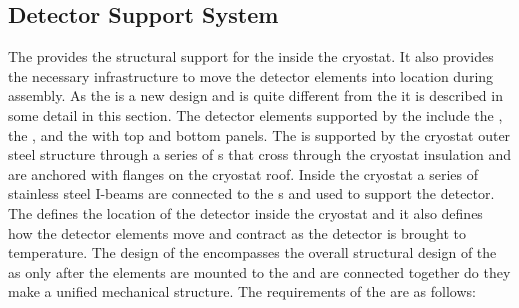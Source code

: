 \subsection{Detector Support System}
\label{sec:fdsp-tc-infr-dss}

The  provides the structural support for the 
inside the cryostat.  It also provides the necessary
infrastructure to move the detector elements into location during
assembly. As the  is a new design and is quite different
from the   it is described in some detail in this
section. The detector elements supported by the  include
the , the , and the  with
top and bottom  panels.  The  is supported by the
cryostat outer steel structure through a series of \fdth{}s that
cross through the cryostat insulation and are anchored with flanges on
the cryostat roof. Inside the cryostat a series of stainless steel
I-beams are connected to the \fdth{}s and used to support the
detector. The  defines the location of the detector inside
the cryostat and it also defines how the detector elements
move and contract as the detector is brought to 
temperature. The design of the  encompasses the overall
structural design of the  as only after the elements are
mounted to the  and are connected together do they make a
unified mechanical structure. The requirements of the  are
as follows:
